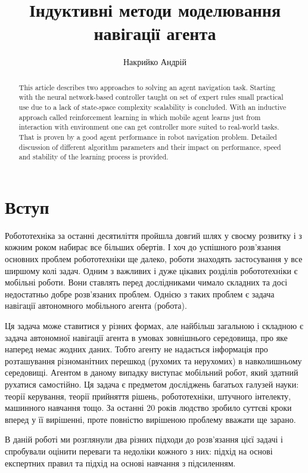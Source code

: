 \documentclass[a4paper,10pt,fleqn]{article}
\title{Індуктивні методи моделювання навігації агента}
\author{Накрийко Андрій}
\begin{document}
\maketitle

\begin{abstract}
This article describes two approaches to solving an agent navigation task. Starting with the neural network-based controller taught on set of expert rules small practical use due to a lack of state-space complexity scalability is concluded. With an inductive approach called reinforcement learning in which mobile agent learns just from interaction with environment one can get controller more suited to real-world tasks. That is proven by a good agent performance in robot navigation problem. Detailed discussion of different algorithm parameters and their impact on performance, speed and stability of the learning process is provided.
\end{abstract}


\section{Вступ}

Робототехніка за останні десятиліття пройшла довгий шлях у своєму розвитку і з кожним роком набирає все більших обертів. І хоч до успішного розв'язання основних проблем робототехніки ще далеко, роботи знаходять застосування у все ширшому колі задач. Одним з важливих і дуже цікавих розділів робототехніки є мобільні роботи. Вони ставлять перед дослідниками чимало складних та досі недостатньо добре розв'язаних проблем. Однією з таких проблем є задача навігації автономного мобільного агента (робота). 

Ця задача може ставитися у різних формах, але найбільш загальною і складною є задача автономної навігації агента в умовах зовнішнього середовища, про яке наперед немає жодних даних. Тобто агенту не надається інформація про розташування різноманітних перешкод (рухомих та нерухомих) в навколишньому середовищі. Агентом в даному випадку виступає мобільний робот, який здатний рухатися самостійно. Ця задача є предметом досліджень багатьох галузей науки: теорії керування, теорії прийняття рішень, робототехніки, штучного інтелекту, машинного навчання тощо. За останні 20 років людство зробило суттєві кроки вперед у її вирішенні, проте повністю вирішеною проблему вважати ще зарано.

В даній роботі ми розглянули два різних підходи до розв'язання цієї задачі і спробували оцінити переваги та недоліки кожного з них: підхід на основі експертних правил та підхід на основі навчання з підсиленням.
\end{document}
